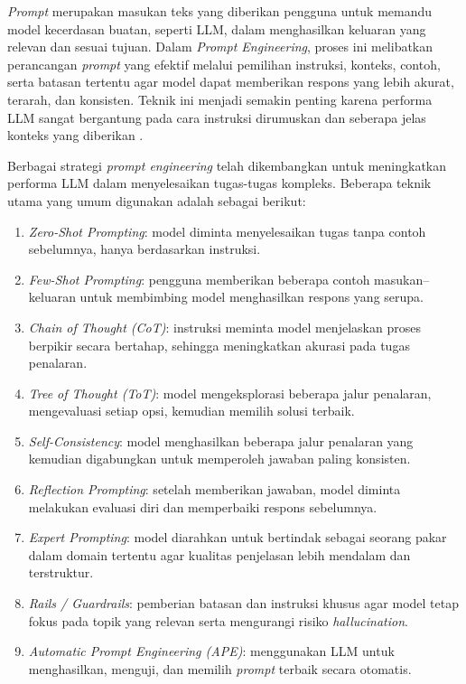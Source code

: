 \textit{Prompt} merupakan masukan teks yang diberikan pengguna untuk memandu model kecerdasan buatan, seperti LLM, dalam menghasilkan keluaran yang relevan dan sesuai tujuan. Dalam \textit{Prompt Engineering}, proses ini melibatkan perancangan \textit{prompt} yang efektif melalui pemilihan instruksi, konteks, contoh, serta batasan tertentu agar model dapat memberikan respons yang lebih akurat, terarah, dan konsisten. Teknik ini menjadi semakin penting karena performa LLM sangat bergantung pada cara instruksi dirumuskan dan seberapa jelas konteks yang diberikan \cite{Minaee2025PromptEngineering, White2023PromptPatternCatalog}.

Berbagai strategi \textit{prompt engineering} telah dikembangkan untuk meningkatkan performa LLM dalam menyelesaikan tugas-tugas kompleks. Beberapa teknik utama yang umum digunakan adalah sebagai berikut:

\begin{enumerate}
    \item \textit{Zero-Shot Prompting}: model diminta menyelesaikan tugas tanpa contoh sebelumnya, hanya berdasarkan instruksi.

    \item \textit{Few-Shot Prompting}: pengguna memberikan beberapa contoh masukan–keluaran untuk membimbing model menghasilkan respons yang serupa.

    \item \textit{Chain of Thought (CoT)}: instruksi meminta model menjelaskan proses berpikir secara bertahap, sehingga meningkatkan akurasi pada tugas penalaran.

    \item \textit{Tree of Thought (ToT)}: model mengeksplorasi beberapa jalur penalaran, mengevaluasi setiap opsi, kemudian memilih solusi terbaik.

    \item \textit{Self-Consistency}: model menghasilkan beberapa jalur penalaran yang kemudian digabungkan untuk memperoleh jawaban paling konsisten.

    \item \textit{Reflection Prompting}: setelah memberikan jawaban, model diminta melakukan evaluasi diri dan memperbaiki respons sebelumnya.

    \item \textit{Expert Prompting}: model diarahkan untuk bertindak sebagai seorang pakar dalam domain tertentu agar kualitas penjelasan lebih mendalam dan terstruktur.

    \item \textit{Rails / Guardrails}: pemberian batasan dan instruksi khusus agar model tetap fokus pada topik yang relevan serta mengurangi risiko \textit{hallucination}.

    \item \textit{Automatic Prompt Engineering (APE)}: menggunakan LLM untuk menghasilkan, menguji, dan memilih \textit{prompt} terbaik secara otomatis.
\end{enumerate}

